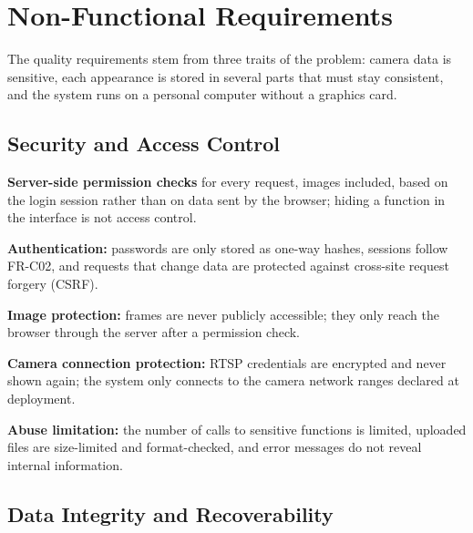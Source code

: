 \section{Non-Functional Requirements}
\label{sec:4.3}

The quality requirements stem from three traits of the problem: camera data is sensitive, each appearance is stored in several parts that must stay consistent, and the system runs on a personal computer without a graphics card.

\subsection{Security and Access Control}
\label{sec:4.3.1}

\begin{reqlist}
    \item[NFR-01] \textbf{Server-side permission checks} for every request, images included, based on the login session rather than on data sent by the browser; hiding a function in the interface is not access control.
    \item[NFR-02] \textbf{Authentication:} passwords are only stored as one-way hashes, sessions follow FR-C02, and requests that change data are protected against cross-site request forgery (CSRF).
    \item[NFR-03] \textbf{Image protection:} frames are never publicly accessible; they only reach the browser through the server after a permission check.
    \item[NFR-04] \textbf{Camera connection protection:} RTSP credentials are encrypted and never shown again; the system only connects to the camera network ranges declared at deployment.
    \item[NFR-05] \textbf{Abuse limitation:} the number of calls to sensitive functions is limited, uploaded files are size-limited and format-checked, and error messages do not reveal internal information.
\end{reqlist}

\subsection{Data Integrity and Recoverability}
\label{sec:4.3.2}
\label{sec:4.3.3}

